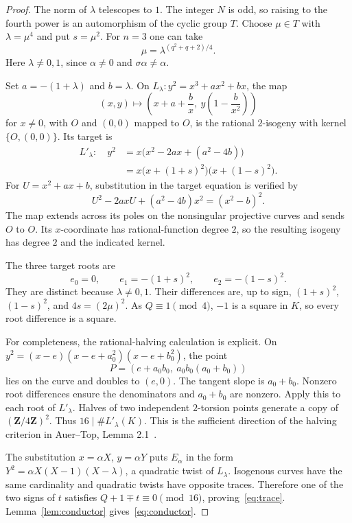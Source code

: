 \documentclass[11pt]{article}
\newcommand{\Z}{\mathbf Z}
\begin{document}
\begin{proof}
The norm of $\lambda$ telescopes to $1$. The integer $N$ is odd, so
raising to the fourth power is an automorphism of the cyclic group $T$.
Choose $\mu\in T$ with $\lambda=\mu^4$ and put $s=\mu^2$.
For $n=3$ one can take
\[
 \mu=\lambda^{(q^2+q+2)/4}.
\]
Here $\lambda\ne0,1$, since $\alpha\ne0$ and $\sigma\alpha\ne\alpha$.

Set $a=-(1+\lambda)$ and $b=\lambda$. On
$L_\lambda:y^2=x^3+ax^2+bx$, the map
\begin{equation}\label{eq:map}
 (x,y)\longmapsto
 \left(x+a+\frac b x,\ y\left(1-\frac b{x^2}\right)\right)
\end{equation}
for $x\ne0$, with $O$ and $(0,0)$ mapped to $O$, is the rational
$2$-isogeny with kernel $\{O,(0,0)\}$. Its target is
\begin{align*}
 L'_\lambda:\quad y^2
 &=x\bigl(x^2-2ax+(a^2-4b)\bigr)\\
 &=x\bigl(x+(1+s)^2\bigr)\bigl(x+(1-s)^2\bigr).
\end{align*}
For $U=x^2+ax+b$, substitution in the target equation is verified by
\[
 U^2-2axU+(a^2-4b)x^2=(x^2-b)^2.
\]
The map extends across its poles on the nonsingular projective curves
and sends $O$ to $O$. Its $x$-coordinate has rational-function degree
$2$, so the resulting isogeny has degree $2$ and the indicated kernel.

The three target roots are
\[
 e_0=0,\qquad e_1=-(1+s)^2,\qquad e_2=-(1-s)^2.
\]
They are distinct because $\lambda\ne0,1$. Their differences are,
up to sign, $(1+s)^2$, $(1-s)^2$, and $4s=(2\mu)^2$.
As $Q\equiv1\pmod4$, $-1$ is a square in $K$, so every root
difference is a square.

For completeness, the rational-halving calculation is explicit.
On $y^2=(x-e)(x-e+a_0^2)(x-e+b_0^2)$, the point
\[
 P=(e+a_0b_0,\ a_0b_0(a_0+b_0))
\]
lies on the curve and doubles to $(e,0)$. The tangent slope is
$a_0+b_0$. Nonzero root differences ensure the denominators and
$a_0+b_0$ are nonzero. Apply this to each root of $L'_\lambda$.
Halves of two independent $2$-torsion points generate a copy of
$(\Z/4\Z)^2$. Thus $16\mid\#L'_\lambda(K)$.
This is the sufficient direction of the halving criterion in
Auer--Top, Lemma 2.1~\cite{auertop}.

The substitution $x=\alpha X$, $y=\alpha Y$ puts $E_\alpha$ in the form
$Y^2=\alpha X(X-1)(X-\lambda)$, a quadratic twist of $L_\lambda$.
Isogenous curves have the same cardinality and quadratic twists have
opposite traces. Therefore one of the two signs of $t$ satisfies
$Q+1\mp t\equiv0\pmod{16}$, proving~\eqref{eq:trace}.
Lemma~\ref{lem:conductor} gives~\eqref{eq:conductor}.
\end{proof}
\end{document}
